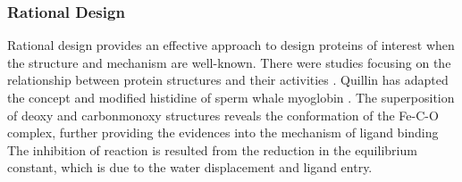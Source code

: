 \begin{refsection}
\subsubsection{Rational Design}
\label{sec:rational-design}

Rational design provides an effective approach to design proteins of interest
when the structure and mechanism are well-known. There were studies focusing on
the relationship between protein structures and their activities
\cite{Beadle2002a,Quillin1993}. Quillin  has adapted the concept
and modified histidine of sperm whale myoglobin \cite{Quillin1993}. The
superposition of deoxy and carbonmonoxy structures reveals the conformation of
the Fe-C-O complex, further providing the evidences into the mechanism of
ligand binding \cite{Quillin1993} The inhibition of reaction is resulted from
the reduction in the equilibrium constant, which is due to the water
displacement and ligand entry. 


\end{refsection}
